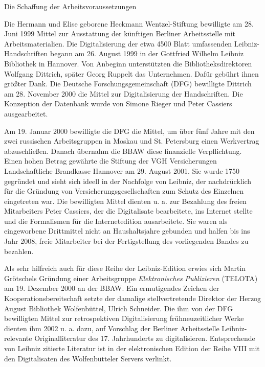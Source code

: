 Die Schaffung der Arbeitsvoraussetzungen\par\vspace{1.0ex}
Die Hermann und Elise geborene Heckmann Wentzel-Stiftung bewilligte am 28. Juni 1999 Mittel zur Ausstattung der k\"{u}nftigen Berliner Arbeitsstelle mit Arbeitsmaterialien. Die Digitalisierung der etwa 4500 Blatt umfassenden Leibniz-Handschriften begann am 26. August 1999 in der Gottfried Wilhelm Leibniz Bibliothek in Hannover. Von Anbeginn unterst\"{u}tzten die Bibliotheks\-direktoren Wolfgang Ditt\-rich, sp\"{a}ter Georg Ruppelt das Unternehmen. Daf\"{u}r geb\"{u}hrt ihnen gr\"{o}{\ss}ter Dank. Die Deutsche Forschungsgemeinschaft (DFG) bewilligte Dittrich am 28. November 2000 die Mittel zur Digitalisierung der Handschriften. Die Konzeption der Datenbank wurde von Simone Rieger und Peter Cassiers ausgearbeitet.\par
Am 19. Januar 2000 bewilligte die DFG die Mittel, um \"{u}ber f\"{u}nf Jahre mit den zwei russischen Arbeitsgruppen in Moskau und St. Petersburg einen Werkvertrag abzuschlie{\ss}en. Danach \"{u}bernahm die BBAW diese finanzielle Verpflichtung.
Einen hohen Betrag gew\"{a}hrte die Stiftung der VGH Versicherungen Landschaft\-liche Brandkasse Hannover am 29. August  2001. Sie wurde 1750 gegr\"{u}ndet und sieht sich ideell in der Nachfolge von Leibniz, der nachdr\"{u}cklich f\"{u}r die Gr\"{u}ndung von Versicherungsgesellschaften zum Schutz des Einzelnen eingetreten war. Die bewilligten Mittel dienten u. a. zur Bezahlung des freien Mitarbeiters Peter Cassiers, der die Digitalisate bearbeitete, ins Internet stellte und die Formalismen f\"{u}r die Internetedition ausarbeitete. Sie waren als eingeworbene Drittmittel nicht an Haushaltsjahre gebunden und halfen bis ins Jahr 2008, freie Mitarbeiter bei der Fertigstellung des vorliegenden Bandes zu bezahlen.\par
Als sehr hilfreich auch f\"{u}r diese Reihe der Leibniz-Edition erwies sich Martin Gr\"{o}tschels Gr\"{u}ndung einer Arbeitsgruppe \textit{Elektronisches Publizieren}  (TELOTA) am 19. Dezember 2000 an der BBAW. Ein ermutigendes Zeichen der Kooperations\-bereitschaft setzte der damalige stellvertretende Direktor der Herzog August Bibliothek Wolfenb\"{u}ttel, Ulrich Schneider. Die ihm von der DFG bewilligten Mittel zur retrospektiven Digitalisierung fr\"{u}hneuzeitlicher Werke dienten ihm 2002 u. a. dazu, auf Vorschlag der Berliner Arbeitsstelle Leibniz-relevante Originalliteratur des 17. Jahrhunderts  zu digitalisieren. Entsprechende von Leibniz zitierte Literatur ist in der elektronischen Edition der Reihe VIII mit den Digitalisaten des Wolfenb\"{u}tteler Servers verlinkt.\par \vspace{2.0ex}

